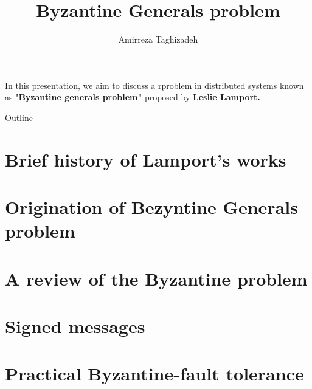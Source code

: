 \documentclass[handout]{beamer}
\title{Byzantine Generals problem}
\author{Amirreza Taghizadeh}
\begin{document}
	\maketitle
\begin{frame}

 In this presentation, we aim to discuss a rproblem in distributed systems known as "\textbf{Byzantine generals problem"} proposed by \textbf{Leslie Lamport.}

\end{frame}


\begin{frame}{Outline}
	\tableofcontents
\end{frame}
\section{Brief history of Lamport's works}


\section{Origination of Bezyntine Generals problem}



\section{A review of the Byzantine problem}


\section{Signed messages}



\section{Practical Byzantine-fault tolerance}


\end{document}
